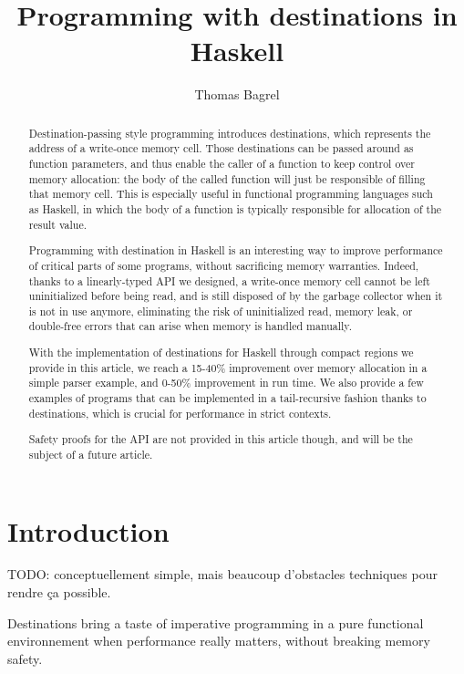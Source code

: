\documentclass[english]{jflart}
\title{Programming with destinations in Haskell}
\author[1]{Thomas Bagrel}
\affil[1]{INRIA/LORIA, Vand\oe{}uvre-lès-Nancy, 54500, France}
\affil[2]{TWEAG, Paris, 75012, France}
\begin{document}
\maketitle

\begin{abstract}
Destination-passing style programming introduces destinations, which represents the address of a write-once memory cell. Those destinations can be passed around as function parameters, and thus enable the caller of a function to keep control over memory allocation: the body of the called function will just be responsible of filling that memory cell. This is especially useful in functional programming languages such as Haskell, in which the body of a function is typically responsible for allocation of the result value.

Programming with destination in Haskell is an interesting way to improve performance of critical parts of some programs, without sacrificing memory warranties. Indeed, thanks to a linearly-typed API we designed, a write-once memory cell cannot be left uninitialized before being read, and is still disposed of by the garbage collector when it is not in use anymore, eliminating the risk of uninitialized read, memory leak, or double-free errors that can arise when memory is handled manually.

With the implementation of destinations for Haskell through compact regions we provide in this article, we reach a 15-40\% improvement over memory allocation in a simple parser example, and 0-50\% improvement in run time. We also provide a few examples of programs that can be implemented in a tail-recursive fashion thanks to destinations, which is crucial for performance in strict contexts.

Safety proofs for the API are not provided in this article though, and will be the subject of a future article.
\end{abstract}

\tableofcontents{}

\section{Introduction}

TODO: conceptuellement simple, mais beaucoup d'obstacles techniques pour rendre ça possible.

 Destinations bring a taste of imperative programming in a pure functional environnement when performance really matters, without breaking memory safety.
\end{document}
